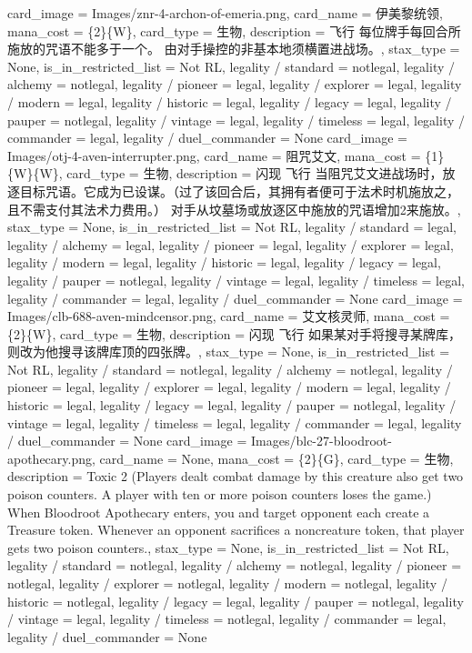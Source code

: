 \documentclass[lang = cn, color = black, 10pt]{AllThatStax}
\begin{document}
\card
{
	card_image = Images/znr-4-archon-of-emeria.png,
	card_name = 伊美黎统领,
	mana_cost = \{2\}\{W\},
	card_type = 生物,
	description = 飞行
	每位牌手每回合所施放的咒语不能多于一个。
	由对手操控的非基本地须横置进战场。,
	stax_type = None,
	is_in_restricted_list = Not RL,
	legality / standard = notlegal,
	legality / alchemy = notlegal,
	legality / pioneer = legal,
	legality / explorer = legal,
	legality / modern = legal,
	legality / historic = legal,
	legality / legacy = legal,
	legality / pauper = notlegal,
	legality / vintage = legal,
	legality / timeless = legal,
	legality / commander = legal,
	legality / duel_commander = None
}
\card
{
	card_image = Images/otj-4-aven-interrupter.png,
	card_name = 阻咒艾文,
	mana_cost = \{1\}\{W\}\{W\},
	card_type = 生物,
	description = 闪现
	飞行
	当阻咒艾文进战场时，放逐目标咒语。它成为已设谋。（过了该回合后，其拥有者便可于法术时机施放之，且不需支付其法术力费用。）
	对手从坟墓场或放逐区中施放的咒语增加{2}来施放。,
	stax_type = None,
	is_in_restricted_list = Not RL,
	legality / standard = legal,
	legality / alchemy = legal,
	legality / pioneer = legal,
	legality / explorer = legal,
	legality / modern = legal,
	legality / historic = legal,
	legality / legacy = legal,
	legality / pauper = notlegal,
	legality / vintage = legal,
	legality / timeless = legal,
	legality / commander = legal,
	legality / duel_commander = None
}
\card
{
	card_image = Images/clb-688-aven-mindcensor.png,
	card_name = 艾文核灵师,
	mana_cost = \{2\}\{W\},
	card_type = 生物,
	description = 闪现
	飞行
	如果某对手将搜寻某牌库，则改为他搜寻该牌库顶的四张牌。,
	stax_type = None,
	is_in_restricted_list = Not RL,
	legality / standard = notlegal,
	legality / alchemy = notlegal,
	legality / pioneer = legal,
	legality / explorer = legal,
	legality / modern = legal,
	legality / historic = legal,
	legality / legacy = legal,
	legality / pauper = notlegal,
	legality / vintage = legal,
	legality / timeless = legal,
	legality / commander = legal,
	legality / duel_commander = None
}
\card
{
	card_image = Images/blc-27-bloodroot-apothecary.png,
	card_name = None,
	mana_cost = \{2\}\{G\},
	card_type = 生物,
	description = Toxic 2 (Players dealt combat damage by this creature also get two poison counters. A player with ten or more poison counters loses the game.)
	When Bloodroot Apothecary enters, you and target opponent each create a Treasure token.
	Whenever an opponent sacrifices a noncreature token, that player gets two poison counters.,
	stax_type = None,
	is_in_restricted_list = Not RL,
	legality / standard = notlegal,
	legality / alchemy = notlegal,
	legality / pioneer = notlegal,
	legality / explorer = notlegal,
	legality / modern = notlegal,
	legality / historic = notlegal,
	legality / legacy = legal,
	legality / pauper = notlegal,
	legality / vintage = legal,
	legality / timeless = notlegal,
	legality / commander = legal,
	legality / duel_commander = None
}
\end{document}
